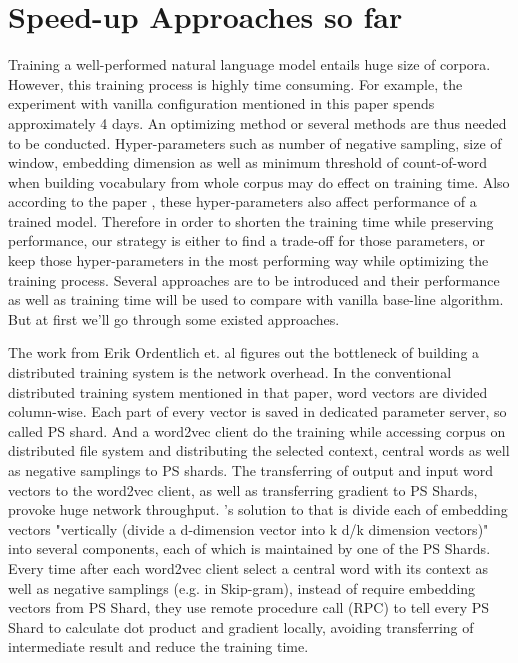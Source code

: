 \section{Speed-up Approaches so far}
Training a well-performed natural language model entails huge size of corpora. However, this training process is highly time consuming. For example, the experiment with vanilla configuration mentioned in this paper spends approximately 4 days. An optimizing method or several methods are thus needed to be conducted. Hyper-parameters such as number of negative sampling, size of window, embedding dimension as well as minimum threshold of count-of-word when building vocabulary from whole corpus may do effect on training time. Also according to the paper \cite{levy2015improving}, these hyper-parameters also affect performance of a trained model. Therefore in order to shorten the training time while preserving performance, our strategy is either to find a trade-off for those parameters, or keep those hyper-parameters in the most performing way while optimizing the training process. Several approaches are to be introduced and their performance as well as training time will be used to compare with vanilla base-line algorithm. But at first we'll go through some existed approaches.

The work from Erik Ordentlich et. al \cite{ordentlich2016network} figures out the bottleneck of building a distributed training system is the network overhead. In the conventional distributed training system mentioned in that paper, word vectors are divided column-wise. Each part of every vector is saved in dedicated parameter server, so called PS shard. And a word2vec client do the training while accessing corpus on distributed file system and distributing the selected context, central words as well as negative samplings to PS shards. The transferring of output and input word vectors to the word2vec client, as well as transferring gradient to PS Shards, provoke huge network throughput. \citep{ordentlich2016network}'s solution to that is divide each of embedding vectors "vertically (divide a d-dimension vector into k d/k dimension vectors)" into several components, each of which is maintained by one of the PS Shards. Every time after each word2vec client select a central word with its context as well as negative samplings (e.g. in Skip-gram), instead of require embedding vectors from PS Shard, they use remote procedure call (RPC) to tell every PS Shard to calculate dot product and gradient locally, avoiding transferring of intermediate result and reduce the training time.

